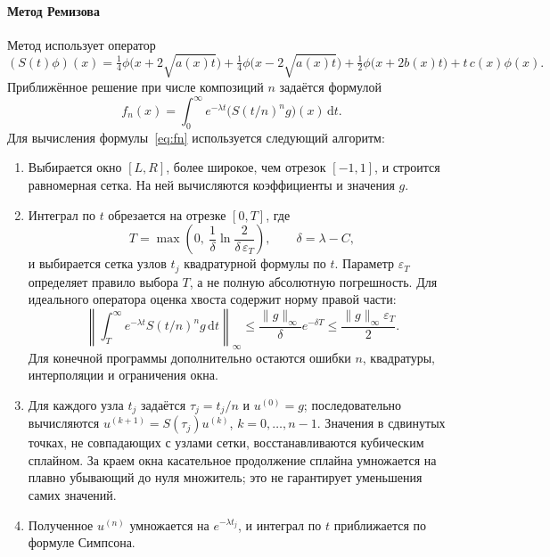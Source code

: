 \documentclass[14pt,a4paper]{extarticle}
\newcommand{\dd}{\mathrm{d}}
\begin{document}
\paragraph{Метод Ремизова\\}
Метод использует оператор
\[
(S(t)\phi)(x)=\tfrac14\phi\bigl(x+2\sqrt{a(x)t}\bigr)
+\tfrac14\phi\bigl(x-2\sqrt{a(x)t}\bigr)
+\tfrac12\phi\bigl(x+2b(x)t\bigr)+t\,c(x)\phi(x).
\]
Приближённое решение при числе композиций $n$ задаётся формулой
\begin{equation}\label{eq:fn}
f_n(x)=\int_0^\infty e^{-\lambda t}\bigl(S(t/n)^ng\bigr)(x)\,\dd t.
\end{equation}
Для вычисления формулы~\eqref{eq:fn} используется следующий алгоритм:
\begin{enumerate}
\item Выбирается окно $[L,R]$, более широкое, чем отрезок $[-1,1]$,
и строится равномерная сетка. На ней вычисляются коэффициенты
и значения $g$.
\item Интеграл по $t$ обрезается на отрезке $[0,T]$, где
\[
T=\max\left(0,\ \frac1\delta\ln\frac{2}{\delta\,\varepsilon_T}\right),
\qquad \delta=\lambda-C,
\]
и выбирается сетка узлов $t_j$ квадратурной формулы по $t$.
Параметр $\varepsilon_T$ определяет правило выбора $T$, а не полную
абсолютную погрешность. Для идеального оператора оценка хвоста содержит
норму правой части:
\[
\left\|\int_T^\infty e^{-\lambda t}S(t/n)^ng\,\dd t\right\|_\infty
\le\frac{\|g\|_\infty}{\delta}e^{-\delta T}
\le\frac{\|g\|_\infty\varepsilon_T}{2}.
\]
Для конечной программы дополнительно остаются ошибки $n$, квадратуры,
интерполяции и ограничения окна.
\item Для каждого узла $t_j$ задаётся $\tau_j=t_j/n$ и $u^{(0)}=g$;
последовательно вычисляются $u^{(k+1)}=S(\tau_j)u^{(k)}$,
$k=0,\dots,n-1$. Значения в сдвинутых точках, не совпадающих с узлами
сетки, восстанавливаются кубическим сплайном. За краем окна
касательное продолжение сплайна умножается на плавно убывающий
до нуля множитель; это не гарантирует уменьшения самих значений.
\item Полученное $u^{(n)}$ умножается на $e^{-\lambda t_j}$, и интеграл
по $t$ приближается по формуле Симпсона.
\end{enumerate}
\end{document}

